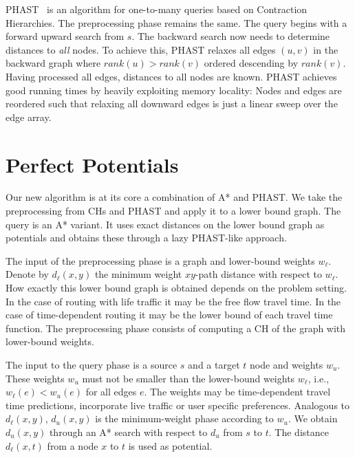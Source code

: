 \documentclass[a4paper,UKenglish,cleveref, autoref]{lipics-v2019}
\begin{document}
PHAST~\cite{dgnw-phast-13} is an algorithm for one-to-many queries based on Contraction Hierarchies.
The preprocessing phase remains the same.
The query begins with a forward upward search from $s$.
The backward search now needs to determine distances to \emph{all} nodes.
To achieve this, PHAST relaxes all edges $(u,v)$ in the backward graph where $rank(u) > rank(v)$ ordered descending by $rank(v)$.
Having processed all edges, distances to all nodes are known.
PHAST achieves good running times by heavily exploiting memory locality:
Nodes and edges are reordered such that relaxing all downward edges is just a linear sweep over the edge array.


\section{Perfect Potentials}
\label{sec:algo}

Our new algorithm is at its core a combination of A* and PHAST.
We take the preprocessing from CHs and PHAST and apply it to a lower bound graph.
The query is an A* variant.
It uses exact distances on the lower bound graph as potentials and obtains these through a lazy PHAST-like approach.


The input of the preprocessing phase is a graph and lower-bound weights $w_{\ell}$.
Denote by $d_{\ell}(x,y)$ the minimum weight $xy$-path distance with respect to $w_{\ell}$.
How exactly this lower bound graph is obtained depends on the problem setting.
In the case of routing with life traffic it may be the free flow travel time.
In the case of time-dependent routing it may be the lower bound of each travel time function.
The preprocessing phase consists of computing a CH of the graph with lower-bound weights.

The input to the query phase is a source $s$ and a target $t$ node and weights $w_u$.
These weights $w_u$ must not be smaller than the lower-bound weights $w_{\ell}$, i.e., $w_{\ell}(e) < w_u(e)$ for all edges $e$.
The weights may be time-dependent travel time predictions, incorporate live traffic or user specific preferences.
Analogous to $d_{\ell}(x,y)$, $d_u(x,y)$ is the minimum-weight phase according to $w_u$.
We obtain $d_u(x,y)$ through an A* search with respect to $d_u$ from $s$ to $t$.
The distance $d_{\ell}(x,t)$ from a node $x$ to $t$ is used as potential.
\end{document}
